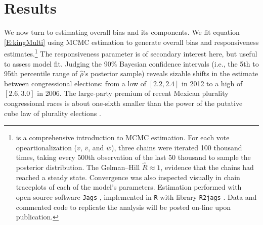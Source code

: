 \documentclass[letter,12pt]{article}
\begin{document}
\section{Results}

We now turn to estimating overall bias and its components. We fit equation \ref{E:kingMulti} using MCMC estimation to generate overall bias and responsiveness estimates.\footnote{\citet{gelman.hill.2007} is a comprehensive introduction to MCMC estimation. For each vote opeartionalization ($v$, $\bar{v}$, and $\bar{w}$), three chains were iterated 100 thousand times, taking every 500th observation of the last 50 thousand to sample the posterior distribution. The Gelman--Hill $\hat{R} \approx 1$, evidence that the chains had reached a steady state. Convergence was also inspected visually in chain traceplots of each of the model's parameters. Estimation performed with open-source software \texttt{Jags} \citep{jags.cite}, implemented in \texttt{R} \citep{r.cite} with library \texttt{R2jags} \citep{r.r2jags}. Data and commented code to replicate the analysis will be posted on-line upon publication.} The responsiveness parameter is of secondary interest here, but useful to assess model fit. Judging the 90\% Bayesian confidence intervals (i.e., the 5th to 95th percentile range of $\hat{\rho}$'s posterior sample) reveals sizable shifts in the estimate between congressional elections: from a low of $[2.2,2.4]$ in 2012 to a high of $[2.6,3.0]$ in 2006. The large-party premium of recent Mexican plurality congressional races is about one-sixth smaller than the power of the putative cube law of plurality elections \citep{taagepera.CubeLaw.1973}. 
\end{document}
